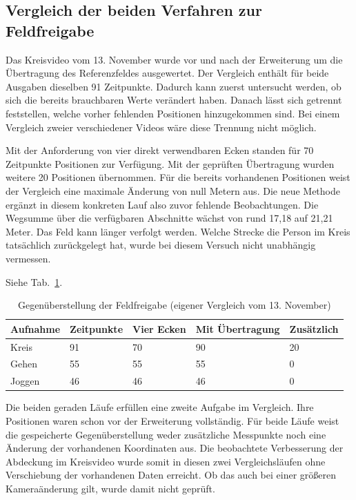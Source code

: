 \subsection{Vergleich der beiden Verfahren zur Feldfreigabe}
Das Kreisvideo vom 13. November wurde vor und nach der Erweiterung um die Übertragung des Referenzfeldes ausgewertet. Der Vergleich enthält für beide Ausgaben dieselben 91 Zeitpunkte. Dadurch kann zuerst untersucht werden, ob sich die bereits brauchbaren Werte verändert haben. Danach lässt sich getrennt feststellen, welche vorher fehlenden Positionen hinzugekommen sind. Bei einem Vergleich zweier verschiedener Videos wäre diese Trennung nicht möglich.

Mit der Anforderung von vier direkt verwendbaren Ecken standen für 70 Zeitpunkte Positionen zur Verfügung. Mit der geprüften Übertragung wurden weitere 20 Positionen übernommen. Für die bereits vorhandenen Positionen weist der Vergleich eine maximale Änderung von null Metern aus. Die neue Methode ergänzt in diesem konkreten Lauf also zuvor fehlende Beobachtungen. Die Wegsumme über die verfügbaren Abschnitte wächst von rund 17,18 auf 21,21 Meter. Das Feld kann länger verfolgt werden. Welche Strecke die Person im Kreis tatsächlich zurückgelegt hat, wurde bei diesem Versuch nicht unabhängig vermessen.

Siehe Tab.~\ref{tab:em-transfer}.
\begin{table}[htbp]\centering\caption{Gegenüberstellung der Feldfreigabe (eigener Vergleich vom 13. November)}\label{tab:em-transfer}
\begin{tabular}{@{}lllll@{}}\toprule Aufnahme & Zeitpunkte & Vier Ecken & Mit Übertragung & Zusätzlich\\\midrule
Kreis & 91 & 70 & 90 & 20\\
Gehen & 55 & 55 & 55 & 0\\
Joggen & 46 & 46 & 46 & 0\\\bottomrule\end{tabular}\end{table}
Die beiden geraden Läufe erfüllen eine zweite Aufgabe im Vergleich. Ihre Positionen waren schon vor der Erweiterung vollständig. Für beide Läufe weist die gespeicherte Gegenüberstellung weder zusätzliche Messpunkte noch eine Änderung der vorhandenen Koordinaten aus. Die beobachtete Verbesserung der Abdeckung im Kreisvideo wurde somit in diesen zwei Vergleichsläufen ohne Verschiebung der vorhandenen Daten erreicht. Ob das auch bei einer größeren Kameraänderung gilt, wurde damit nicht geprüft.

